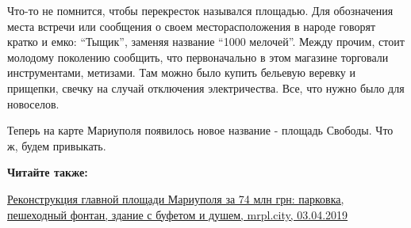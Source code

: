 Что-то не помнится, чтобы перекресток назывался площадью. Для обозначения места
встречи или сообщения о своем месторасположения в народе говорят кратко и емко:
\enquote{Тыщик}, заменяя название \enquote{1000 мелочей}. Между прочим, стоит молодому
поколению сообщить, что первоначально в этом магазине торговали инструментами,
метизами. Там можно было купить бельевую веревку и прищепки, свечку на случай
отключения электричества. Все, что нужно было для новоселов.

Теперь на карте Мариуполя появилось новое название - площадь Свободы. Что ж,
будем привыкать.

\textbf{Читайте также:}

\href{https://mrpl.city/news/view/rekonstruktsiya-glavnoj-ploshhadi-mariupolya-za-74-mln-grn-parkovka-peshehodnyj-fontan-zdanie-s-bufetom-i-dushem-foto}{Реконструкция главной площади Мариуполя за 74 млн грн: парковка, пешеходный фонтан, здание с буфетом и душем, mrpl.city, 03.04.2019}
